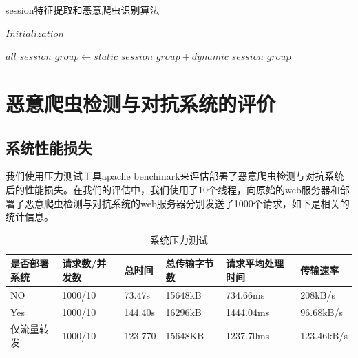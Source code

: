 \documentclass[doctor,privacy,twoside]{buaa_mac}
\begin{document}
\begin{algorithm}[!h]
  \caption{session特征提取和恶意爬虫识别算法}

$Initialization$
 
$all\_{}session\_{}group  \leftarrow static\_{}session\_{}group +  dynamic\_{}session\_{}group$ \\

\end{algorithm}


\section{恶意爬虫检测与对抗系统的评价}

\subsection{系统性能损失}
我们使用压力测试工具apache benchmark来评估部署了恶意爬虫检测与对抗系统后的性能损失。在我们的评估中，我们使用了10个线程，向原始的web服务器和部署了恶意爬虫检测与对抗系统的web服务器分别发送了1000个请求，如下是相关的统计信息。

\centerline{}
\begin{table}[h]
  \caption{系统压力测试}
  \label{tab:papercomponents}
  \centering
\begin{tabular}{|p{2cm}<{\centering}||p{2cm}<{\centering}|p{2cm}<{\centering}|p{2cm}<{\centering}|p{2cm}<{\centering}|p{2cm}<{\centering}|}
    \hline
   是否部署系统 &  请求数/并发数  & 总时间  &  总传输字节数  & 请求平均处理时间  &  传输速率  \\
    \hline
NO     &      1000/10  &    73.47s   &  15648kB  &    734.66ms   &   208kB/s \\
Yes     &     1000/10  &     144.40s &  16296kB   &  1444.04ms    &  96.68kB/s\\
仅流量转发 &    1000/10 &     123.770  & 15648KB   &  1237.70ms   &   123.46kB/s \\

\hline
    \end{tabular}
\end{table}
\centerline{}
\end{document}
